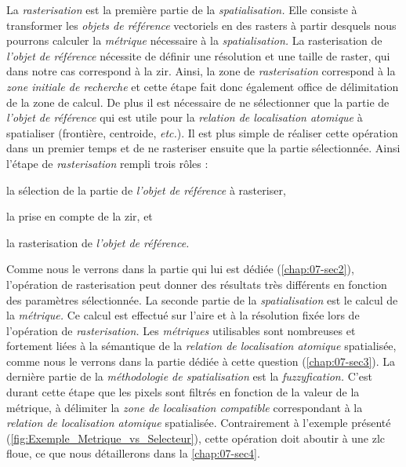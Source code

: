 La \emph{rasterisation} est la première partie de la
\emph{spatialisation.} Elle consiste à transformer les \emph{objets de
  référence} vectoriels en des rasters à partir desquels nous pourrons
calculer la \emph{métrique} nécessaire à la \emph{spatialisation.} La
rasterisation de \emph{l'objet de référence} nécessite de définir une
résolution et une taille de raster, qui dans notre cas correspond à la
\ac{zir}. Ainsi, la zone de \emph{rasterisation} correspond à la
\emph{zone initiale de recherche} et cette étape fait donc également
office de délimitation de la zone de calcul. De plus il est nécessaire
de ne sélectionner que la partie de \emph{l'objet de référence} qui
est utile pour la \emph{relation de localisation atomique} à
spatialiser (\eg frontière, centroide, \emph{etc.}). Il est plus
simple de réaliser cette opération dans un premier temps et de ne
rasteriser ensuite que la partie sélectionnée. Ainsi l'étape de
\emph{rasterisation} rempli trois rôles :
%
\begin{enumerate*}[label=(\alph*)]
\item la sélection de la partie de \emph{l'objet de référence} à rasteriser,
\item la prise en compte de la \ac{zir}, et
\item la rasterisation de \emph{l'objet de référence.}  
\end{enumerate*}
%
Comme nous le verrons dans la partie qui lui est dédiée
(\autoref{chap:07-sec2}), l'opération de rasterisation peut donner des
résultats très différents en fonction des paramètres sélectionnée. La
seconde partie de la \emph{spatialisation} est le calcul de la
\emph{métrique.} Ce calcul est effectué sur l'aire et à la résolution
fixée lors de l'opération de \emph{rasterisation.} Les
\emph{métriques} utilisables sont nombreuses et fortement liées à la
sémantique de la \emph{relation de localisation atomique} spatialisée,
comme nous le verrons dans la partie dédiée à cette question
(\autoref{chap:07-sec3}). La dernière partie de la \emph{méthodologie
  de spatialisation} est la \emph{fuzzyfication.} C'est durant cette
étape que les pixels sont filtrés en fonction de la valeur de la
métrique, à délimiter la \emph{zone de localisation compatible}
correspondant à la \emph{relation de localisation atomique}
spatialisée. Contrairement à l'exemple présenté
(\autoref{fig:Exemple_Metrique_vs_Selecteur}), cette opération doit
aboutir à une \ac{zlc} floue, ce que nous détaillerons dans la
\autoref{chap:07-sec4}.


